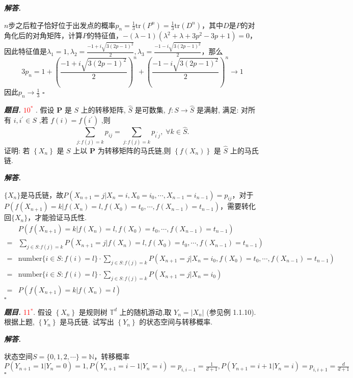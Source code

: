 \documentclass[10pt, a4paper, oneside]{ctexart}
\newenvironment{problem}{\begin{framed}\par\noindent\textbf{\textit{题目. }}}{\end{framed}\par}
\newenvironment{solution}{%
  \par\noindent\textbf{\textit{解答. }}\ignorespaces
}{%
  \hfill\ensuremath{\square}\par %
}
\begin{document}
\begin{solution}
$n$步之后粒子恰好位于出发点的概率$p_n=\frac{1}{3}\text{tr}(P^n)=\frac{1}{3}\text{tr}(D^n)$，其中$D$是$P$的对角化后的对角矩阵，计算$P$的特征值，$-(\lambda-1)(\lambda^2+\lambda+3p^2-3p+1)=0$，因此特征值是$\lambda_1=1,\lambda_2=\frac{-1+i\sqrt{3(2p-1)^2}}{2},\lambda_3=\frac{-1-i\sqrt{3(2p-1)^2}}{2}$，那么
$$3p_n=1+(\frac{-1+i\sqrt{3(2p-1)^2}}{2})^n+(\frac{-1-i\sqrt{3(2p-1)^2}}{2})^n\to 1$$
因此$p_n \to \frac{1}{3}$
\end{solution}
\begin{problem}
    \textcolor{red}{\( {10}^{ * } \) }. 假设 \( \mathbf{P} \) 是 \( S \) 上的转移矩阵, \( \widehat{S} \) 是可数集, \( f : S \rightarrow \widehat{S} \) 是满射, 满足: 对所有 \( i,{i}^{\prime } \in S \) ,若 \( f\left( i\right) = f\left( {i}^{\prime }\right) \) ,则
\[\mathop{\sum }\limits_{{j : f\left( j\right) = k}}{p}_{ij} = \mathop{\sum }\limits_{{j : f\left( j\right) = k}}{p}_{{i}^{\prime }j},\;\forall k \in \widehat{S}.\]
证明: 若 \( \left\{ {X}_{n}\right\} \) 是 \( S \) 上以 \( \mathbf{P} \) 为转移矩阵的马氏链,则 \( \left\{ {f\left( {X}_{n}\right) }\right\} \) 是 \( \widehat{S} \) 上的马氏链.
\end{problem}
\begin{solution}
$\{X_n\}$是马氏链，故$P(X_{n+1}=j|X_n=i,X_0=i_0,\cdots,X_{n-1}=i_{n-1})=p_{ij}$，对于$P(f(X_{n+1})=k|f(X_n)=l,f(X_0)=t_0,\cdots,f(X_{n-1})=t_{n-1})$，需要转化回$\{X_n\}$，才能验证马氏性.
\begin{align*}
&P(f(X_{n+1})=k|f(X_n)=l,f(X_0)=t_0,\cdots,f(X_{n-1})=t_{n-1})\\
=& \sum_{j\in S: f(j)=k} P(X_{n+1}=j|f(X_n)=l,f(X_0)=t_0,\cdots,f(X_{n-1})=t_{n-1})\\
=& \text{number} \{i\in S: f(i)=l \}\cdot\sum_{j\in S: f(j)=k} P(X_{n+1}=j|X_n=i_0,f(X_0)=t_0,\cdots,f(X_{n-1})=t_{n-1})\\
=&\text{number} \{i\in S: f(i)=l \}\cdot\sum_{j\in S: f(j)=k} P(X_{n+1}=j|X_n=i_0)\\
=&P(f(X_{n+1})=k|f(X_n)=l)
\end{align*}
\end{solution}

\begin{problem}
    \textcolor{red}{11$^*$}. 假设 \( \left\{ {X}_{n}\right\} \) 是规则树 \( {\mathbb{T}}^{d} \) 上的随机游动,取 \( {Y}_{n} = \left| {X}_{n}\right| \) (参见例 1.1.10). 根据上题, \( \left\{ {Y}_{n}\right\} \) 是马氏链. 试写出 \( \left\{ {Y}_{n}\right\} \) 的状态空间与转移概率.
\end{problem}
\begin{solution}
状态空间$S=\{0,1,2,\cdots\}=\mathbb{N}$，转移概率$P(Y_{n+1}=1|Y_{n}=0)=1,P(Y_{n+1}=i-1|Y_{n}=i)=p_{i,i-1}=\frac{1}{d+1},P(Y_{n+1}=i+1|Y_{n}=i)=p_{i,i+1}=\frac{d}{d+1}$
\end{solution}
\end{document}
